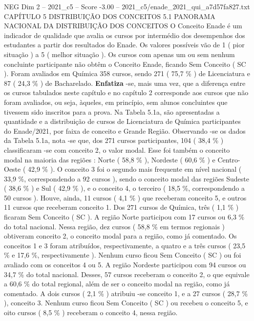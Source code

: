 \begin{textsample}{NEG Dim 2 – 2021\_c5 – Score -3.00 – 2021\_c5/enade\_2021\_qui\_a7d57fa827.txt}  \label{ex:f2_neg_141}
CAPÍTULO 5 DISTRIBUIÇÃO DOS CONCEITOS 5.1 PANORAMA NACIONAL DA DISTRIBUIÇÃO DOS CONCEITOS O Conceito Enade é um indicador de qualidade que avalia os cursos por intermédio dos desempenhos dos estudantes a partir dos resultados do Enade.
Os valores possíveis vão de 1 ( pior situação ) a 5 ( melhor situação ).
Os cursos com apenas um ou sem nenhum concluinte participante não obtêm o Conceito Enade, ficando Sem Conceito ( SC ).
Foram avaliados em Química 358 cursos, sendo 271 ( 75,7 \% ) de Licenciatura e 87 ( 24,3 \% ) de Bacharelado. \textbf{Enfatiza} -se, mais uma vez, que a diferença entre os cursos tabulados neste capítulo e no capítulo 2 corresponde aos cursos que não foram avaliados, ou seja, àqueles, em princípio, sem alunos concluintes que tivessem sido inscritos para a prova.
Na Tabela 5.1a, são apresentadas a quantidade e a distribuição de cursos de Licenciatura de Química participantes do Enade/2021, por faixa de conceito e Grande Região.
Observando -se os dados da Tabela 5.1a, nota -se que, dos 271 cursos participantes, 104 ( 38,4 \% ) classificaram -se com conceito 2, o valor modal.
Esse foi também o conceito modal na maioria das regiões : Norte ( 58,8 \% ), Nordeste ( 60,6 \% ) e Centro-Oeste ( 42,9 \% ).
O conceito 3 foi o segundo mais frequente em nível nacional ( 33,9 \%, correspondendo a 92 cursos ), sendo o conceito modal das regiões Sudeste ( 38,6 \% ) e Sul ( 42,9 \% ), e o conceito 4, o terceiro ( 18,5 \%, correspondendo a 50 cursos ).
Houve, ainda, 11 cursos ( 4,1 \% ) que receberam conceito 5, e outros 11 cursos que receberam conceito 1.
Dos 271 cursos de Química, três ( 1,1 \% ) ficaram Sem Conceito ( SC ).
A região Norte participou com 17 cursos ou 6,3 \% do total nacional.
Nessa região, dez cursos ( 58,8 \% em termos regionais ) obtiveram conceito 2, o conceito modal para a região, como já comentado.
Os conceitos 1 e 3 foram atribuídos, respectivamente, a quatro e a três cursos ( 23,5 \% e 17,6 \%, respectivamente ).
Nenhum curso ficou Sem Conceito ( SC ) ou foi avaliado com os conceitos 4 ou 5.
A região Nordeste participou com 94 cursos ou 34,7 \% do total nacional.
Desses, 57 cursos receberam o conceito 2, o que equivale a 60,6 \% do total regional, além de ser o conceito modal na região, como já comentado.
A dois cursos ( 2,1 \% ) atribuiu -se conceito 1, e a 27 cursos ( 28,7 \% ), conceito 3.
Nenhum curso ficou Sem Conceito ( SC ) ou recebeu o conceito 5, e oito cursos ( 8,5 \% ) receberam o conceito 4, nessa região.

\end{textsample}
